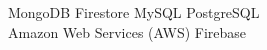 \documentclass[draft=false]{deedy-resume-openfont}
\begin{document}
\begin{minipage}[t]{0.39\textwidth}
\vspace{0.3cm}
\textbullet{}MongoDB{} {} {} {} {} {} {} {} {} {} 
\textbullet{}Firestore {} {} {} {} {} {} {} {} {} {} {} {} {} {}\vspace{0.3cm}\textbullet{}MySQL {} {} {} {} {} {} {} {} {} {} {} {} {} {}
\textbullet{}PostgreSQL {} {} {} {} {} {} {} {} {} {} {} {} {} {}\\
\vspace{0.4cm}
\vspace{0.3cm}
\textbullet{}Amazon Web Services (AWS) {} {} {} {} {} {} {} {}  {} {} \textbullet{} Firebase {} {} {} {} {} {} {} {} {} {} {} {} {}
 
\sectionsep



%
%

\end{minipage} 
\hfill
\end{document}
